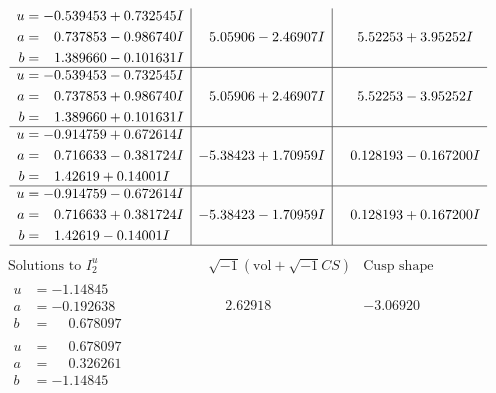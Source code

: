 \documentclass[1p]{elsarticle_modified}
\theoremstyle{definition}
\newcommand{\I}{\sqrt{-1}}
\begin{document}
$$\begin{array}{c|c|c}
\begin{aligned}
u &= -0.539453 + 0.732545 I \\
a &= \phantom{-}0.737853 - 0.986740 I \\
b &= \phantom{-}1.389660 - 0.101631 I\end{aligned}
 & \phantom{-}5.05906 - 2.46907 I & \phantom{-}5.52253 + 3.95252 I \\ \hline\begin{aligned}
u &= -0.539453 - 0.732545 I \\
a &= \phantom{-}0.737853 + 0.986740 I \\
b &= \phantom{-}1.389660 + 0.101631 I\end{aligned}
 & \phantom{-}5.05906 + 2.46907 I & \phantom{-}5.52253 - 3.95252 I \\ \hline\begin{aligned}
u &= -0.914759 + 0.672614 I \\
a &= \phantom{-}0.716633 - 0.381724 I \\
b &= \phantom{-}1.42619 + 0.14001 I\end{aligned}
 & -5.38423 + 1.70959 I & \phantom{-}0.128193 - 0.167200 I \\ \hline\begin{aligned}
u &= -0.914759 - 0.672614 I \\
a &= \phantom{-}0.716633 + 0.381724 I \\
b &= \phantom{-}1.42619 - 0.14001 I\end{aligned}
 & -5.38423 - 1.70959 I & \phantom{-}0.128193 + 0.167200 I\\
 \hline 
 \end{array}$$\newpage$$\begin{array}{c|c|c}  
\text{Solutions to }I^u_{2}& \I (\text{vol} + \sqrt{-1}CS) & \text{Cusp shape}\\
 \hline 
\begin{aligned}
u &= -1.14845\phantom{ +0.000000I} \\
a &= -0.192638\phantom{ +0.000000I} \\
b &= \phantom{-}0.678097\phantom{ +0.000000I}\end{aligned}
 & \phantom{-}2.62918\phantom{ +0.000000I} & -3.06920\phantom{ +0.000000I} \\ \hline\begin{aligned}
u &= \phantom{-}0.678097\phantom{ +0.000000I} \\
a &= \phantom{-}0.326261\phantom{ +0.000000I} \\
b &= -1.14845\phantom{ +0.000000I}\end{aligned}

\end{array}$$
\end{document}
